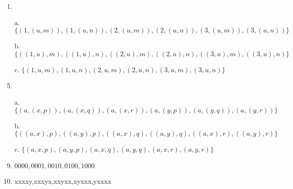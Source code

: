 \documentclass{article}
\begin{document}
\begin{enumerate}[label=\textbf{\arabic*.}]
\item %
\item[a.] $\{(1,(u,m)),(1,(u,n)),(2,(u,m)),(2,(u,n)),(3,(u,m)),(3,(u,n))\}$
\item[b.] $\{((1,u),m),((1,u),n),((2,u),m),((2,u),n),((3,u),m),((3,u),n)\}$
\item[c.] $\{(1,u,m),(1,u,n),(2,u,m),(2,u,n),(3,u,m),(3,u,n)\}$
\item %
\item[a.] $\{(a,(x,p)),(a,(x,q)),(a,(x,r)),(a,(y,p)),(a,(y,q)),(a,(y,r))\}$
\item[b.] $\{((a,x),p),((a,y),p),((a,x),q),((a,y),q),((a,x),r),((a,y),r)\}$
\item[c.] $\{(a,x,p),(a,y,p),(a,x,q),(a,y,q),(a,x,r),(a,y,r)\}$
\item %
$0000,0001,0010,0100,1000$
\item %
xxxxy,xxxyx,xxyxx,xyxxx,yxxxx

\end{enumerate}
\end{document}
